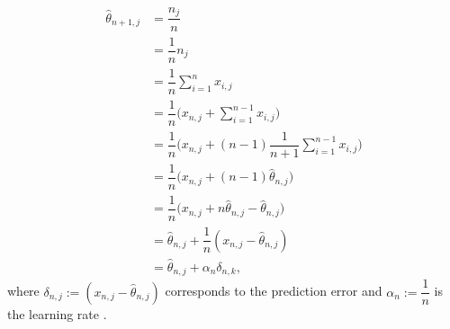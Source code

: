 \documentclass[a4paper,12pt]{article}
\begin{document}
\begin{equation}
\begin{aligned}
\hat{\theta}_{n+1,j} &= \dfrac{n_{j}}{n} \\ 
&= \dfrac{1}{n}n_{j} \\ 
&= \dfrac{1}{n}\sum_{i=1}^{n}x_{i,j} \\
&= \dfrac{1}{n}\Big(x_{n,j} + \sum_{i=1}^{n-1}x_{i,j} \Big) \\
&= \dfrac{1}{n}\Big(x_{n,j} + (n-1)\dfrac{1}{n+1}\sum_{i=1}^{n-1}x_{i,j} \Big) \\
&= \dfrac{1}{n}\Big(x_{n,j} + (n-1)\hat{\theta}_{n,j} \Big) \\
&= \dfrac{1}{n}\big(x_{n,j}+n\hat{\theta}_{n,j}-\hat{\theta}_{n,j}\big) \\
&= \hat{\theta}_{n,j} + \dfrac{1}{n}(x_{n,j} - \hat{\theta}_{n,j}) \\
&= \hat{\theta}_{n,j} + \alpha_n\delta_{n,k},
\end{aligned}
\label{eq:model}
\end{equation}
where $\delta_{n,j} := (x_{n,j}-\hat{\theta}_{n,j})$ corresponds to the prediction error and $\alpha_n := \dfrac{1}{n}$  is the learning rate  \citep{Sutton1998}.






\end{document}
